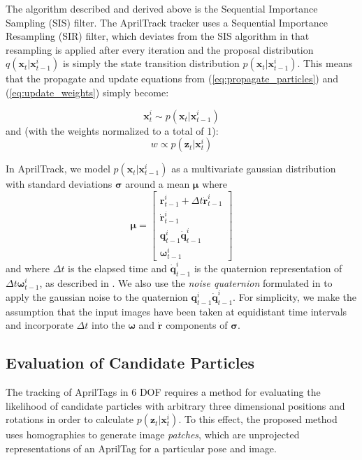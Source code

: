 \documentclass[letterpaper, 10 pt, conference]{ieeeconf}
\renewcommand{\vec}[1]{\boldsymbol{#1}}
\renewcommand{\eqref}[1]{\textup{{\normalfont(\ref{#1}}\normalfont)}}
\begin{document}
The algorithm described and derived above is the Sequential Importance Sampling (SIS) filter. The AprilTrack tracker uses a Sequential Importance Resampling (SIR) filter, which deviates from the SIS algorithm in that resampling is applied after every iteration and the proposal distribution $q(\vec{x}_t|\vec{x}^i_{t-1})$ is simply the state transition distribution $p(\vec{x}_t|\vec{x}^i_{t-1})$. This means that the propagate and update equations from \eqref{eq:propagate_particles} and \eqref{eq:update_weights} simply become:

\begin{equation}
	\vec{x}^i_t \sim p(\vec{x}_t|\vec{x}^i_{t-1})
\end{equation}
and (with the weights normalized to a total of 1):
\begin{equation}
	w \propto p(\vec{z}_t|\vec{x}^i_t)
\end{equation}

In AprilTrack, we model $p(\vec{x}_t|\vec{x}^i_{t-1})$ as a multivariate gaussian distribution with standard deviations $\vec{\sigma}$ around a mean $\vec{\mu}$ where
\begin{equation} \label{eq:propagation_mean}
\vec{\mu} = 
\begin{bmatrix} 
	\vec{r}^i_{t-1} + \Delta t \dot{\vec{r}}^i_{t-1} \\
 	\dot{\vec{r}}^i_{t-1} \\
	\vec{q}^i_{t-1} \dot{\vec{q}}^i_{t-1}\\
	\vec{\omega}^i_{t-1}
\end{bmatrix}
\end{equation}
and where $\Delta t$ is the elapsed time and $\dot{\vec{q}}^i_{t-1}$ is the quaternion representation of $\Delta t  \vec{\omega}^i_{t-1}$, as described in \citep{KalmanFilter}. We also use the \emph{noise quaternion} formulated in \citep{KalmanFilter} to apply the gaussian noise to the quaternion $\vec{q}^i_{t-1} \dot{\vec{q}}^i_{t-1}$. For simplicity, we make the assumption that the input images have been taken at equidistant time intervals and incorporate $\Delta t$ into the $\vec{\omega}$ and $\dot{\vec{r}}$ components of $\vec{\sigma}$.

\subsection{Evaluation of Candidate Particles} \label{sec:candidate_particles}

The tracking of AprilTags in 6 DOF requires a method for evaluating the likelihood of candidate particles with arbitrary three dimensional positions and rotations in order to calculate $p(\vec{z}_t|\vec{x}^i_t)$. To this effect, the proposed method uses homographies to generate image \emph{patches}, which are unprojected representations of an AprilTag for a particular pose and image.
\end{document}
